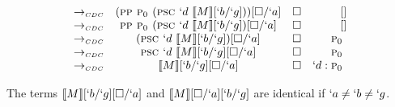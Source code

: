 \begin{Proof}
\[\begin{array}{lcrr}
  \tocdc\     & (\pp \gp (\psc `d\ \tr{M}[`b/`g]))[\square/`a]   & \square & []        \\
  \tocdc\     & \pp \gp (\psc `d\ \tr{M}[`b/`g])[\square/`a]     & \square & []        \\
  \tocdc\     & (\psc `d\ \tr{M}[`b/`g])[\square/`a]             & \square & \gp       \\
  \tocdc\     & \psc `d\ \tr{M}[`b/`g][\square/`a]               & \square & \gp       \\
  \tocdc\     & \tr{M}[`b/`g][\square/`a]                        & \square & `d:\gp \\
\end{array}
\]
\begin{remark}
  The terms $\llbracket M \rrbracket[`b/`g][\square/`a]$ and $\llbracket M \rrbracket[\square/`a][`b/`g]$ are identical if $`a \not= `b \not= `g$.
\end{remark}


\end{Proof}
